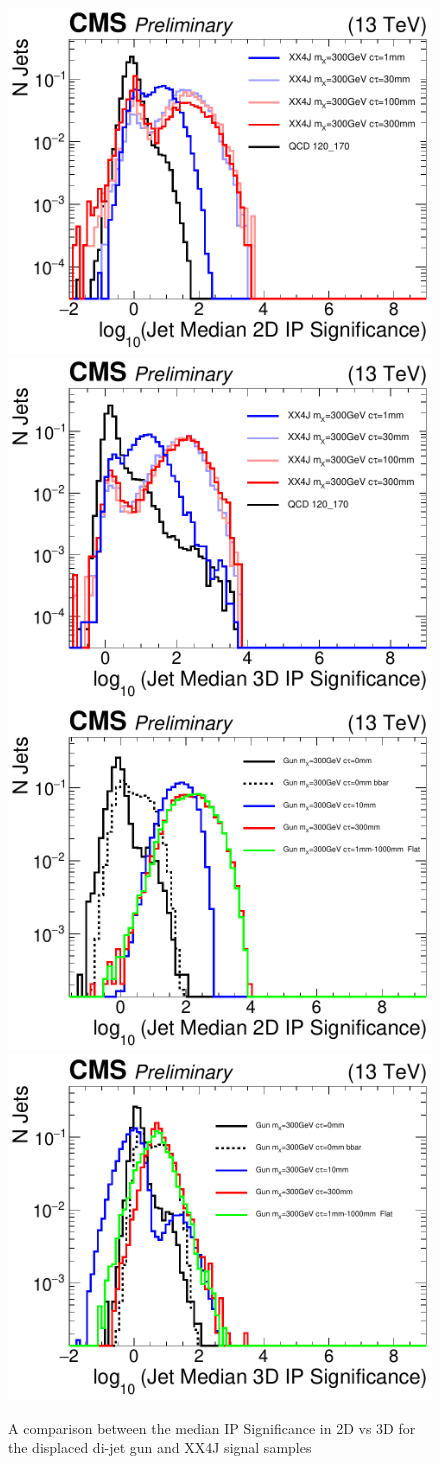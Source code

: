 \begin{figure}
\begin{center}
\includegraphics[width=.45\textwidth]{figures/an_jetid/VTX_MATCH_IP/XX4J_log_jetMedianIPSig2D}
\includegraphics[width=.45\textwidth]{figures/an_jetid/VTX_MATCH_IP/XX4J_log_jetMedianIPSig3D}
\includegraphics[width=.45\textwidth]{figures/an_jetid/VTX_MATCH_IP/GUN_log_jetMedianIPSig2D}
\includegraphics[width=.45\textwidth]{figures/an_jetid/VTX_MATCH_IP/GUN_log_jetMedianIPSig3D}
\end{center}
\caption{A comparison between the median IP Significance in 2D vs 3D for the displaced di-jet gun and  XX4J signal samples}
\label{fig:ipsig_2d_3d}
\end{figure}

